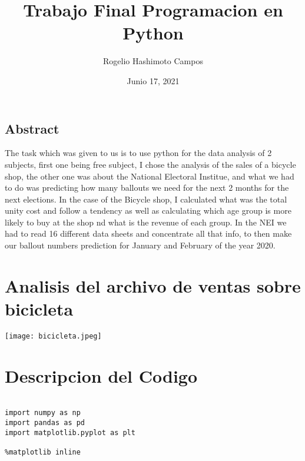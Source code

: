 \documentclass[
	12pt, %
]{fphw}
\title{Trabajo Final Programacion en Python} %
\author{Rogelio Hashimoto Campos} %
\date{Junio 17, 2021} %
\institute{Universidad de Guanajuato \\ DCI} %
\begin{document}
\maketitle %


\subsection*{Abstract}

The task which was given to us is to use python for the data analysis of 2 subjects, first one being free subject, I chose the analysis of the sales of a bicycle shop, the other one was about the National Electoral Institue, and what we had to do was predicting how many ballouts we need for the next 2 months for the next elections.
In the case of the Bicycle shop, I calculated what was the total unity cost and follow a tendency as well as calculating which age group is more likely to buy at the shop nd what is the revenue of each group.
In the NEI we had to read 16 different data sheets and concentrate all that info, to then make our ballout numbers prediction for January and February of the year 2020.





\section*{Analisis del archivo de ventas sobre bicicleta}


\begin{center}
	\texttt{[image: bicicleta.jpeg]} %
\end{center}

\section*{Descripcion del Codigo}

\lstset{language=Python}
\lstset{frame=lines}
\lstset{basicstyle=\footnotesize}
\begin{lstlisting}

import numpy as np
import pandas as pd
import matplotlib.pyplot as plt

%matplotlib inline


\end{lstlisting}
\end{document}

